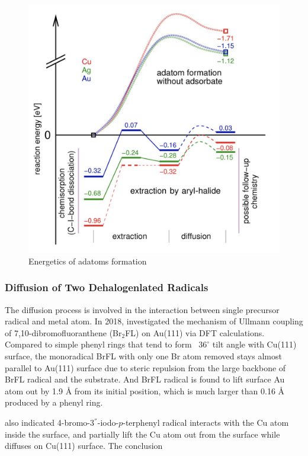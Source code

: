 \documentclass[journal=jacsat,manuscript=article]{achemso}
\begin{document}
\begin{figure}[ht]
\centering
\includegraphics[scale=0.3]{Fig/Adatom-formation.png}
\caption{Energetics of adatoms formation}
\label{fig:3}
\end{figure}


\subsubsection{Diffusion of Two Dehalogenlated Radicals}
The diffusion process is involved in the interaction between single precursor radical and metal atom. 
In 2018, \citeauthor{jpcc2018}\cite{jpcc2018} investigated the mechanism of Ullmann coupling of 7,10-dibromofluoranthene (Br$_{2}$FL) on Au(111) via DFT calculations. Compared to simple phenyl rings that tend to form ~$36^\circ$ tilt angle with Cu(111) surface\cite{pccp2010}, the monoradical BrFL with only one Br atom removed stays almost parallel to Au(111) surface due to steric repulsion from the large backbone of BrFL radical and the substrate. And BrFL radical is found to lift surface Au atom out by 1.9 \si{\angstrom} from its initial position, which is much larger than 0.16 \si{\angstrom} produced by a phenyl ring. 

\citeauthor{acsnano2019}\cite{acsnano2019} also indicated 4-bromo-3$^{''}$-iodo-$p$-terphenyl radical interacts with the Cu atom inside the surface, and partially lift the Cu atom out from the surface while diffuses on Cu(111) surface. The conclusion 
\end{document}
